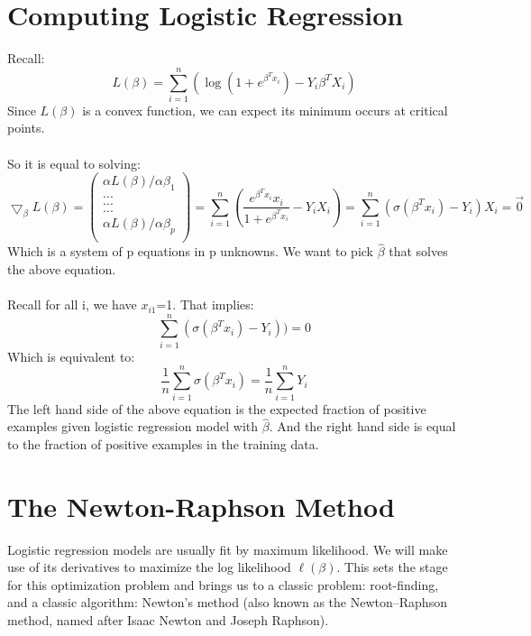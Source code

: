 \documentclass[a4paper]{article}
\begin{document}
\section{Computing Logistic Regression}
Recall:
\begin{equation*}
L(\beta)=\sum_{i=1}^{n} (\log(1+e^{\beta^T x_i})-Y_i \beta^T X_i)
\end{equation*}
Since $L(\beta)$ is a convex function, we can expect its minimum occurs at critical points.\\
\\
So it is equal to solving:
\begin{equation*}
\bigtriangledown_\beta L(\beta)=
\begin{pmatrix}
\alpha L(\beta)/\alpha \beta_1\\
...\\
...\\
...\\
\alpha L(\beta)/\alpha \beta_p\\
\end{pmatrix}
=
\sum_{i=1}^{n}(\dfrac{e^{\beta^T x_i} x_i}{1+e^{\beta^T x_i}}-Y_i X_i)
=
\sum_{i=1}^{n} (\sigma (\beta^T x_i)-Y_i)X_i
=
\vec{0}
\end{equation*}
Which is a system of p equations in p unknowns.
We want to pick $\hat{\beta}$ that solves the above equation.\\
\\Recall for all i, we have $x_{i1}$=1. That implies:\\
\begin{equation*}
\sum_{i=1}^{n}(\sigma (\beta^T x_i)-Y_i))=0
\end{equation*}
Which is equivalent to:
\begin{equation*}
\dfrac{1}{n}\sum_{i=1}^{n}\sigma (\beta^T x_i)=\dfrac{1}{n}\sum_{i=1}^{n}Y_i
\end{equation*}
The left hand side of the above equation is the expected fraction of positive examples given logistic regression model with $\hat{\beta}$. And the right hand side is equal to the fraction of positive examples in the training data.

\section{The Newton-Raphson Method}
Logistic regression models are usually fit by maximum likelihood. We will make use of its derivatives to maximize the log likelihood $\ell(\beta)$. This sets the stage for this optimization problem and brings us to a classic problem: root-finding, and a classic algorithm: Newton's method (also known as the Newton–Raphson method, named after Isaac Newton and Joseph Raphson).
\end{document}
